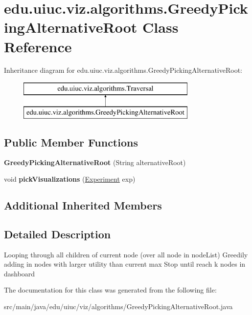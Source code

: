 \hypertarget{classedu_1_1uiuc_1_1viz_1_1algorithms_1_1_greedy_picking_alternative_root}{}\section{edu.\+uiuc.\+viz.\+algorithms.\+Greedy\+Picking\+Alternative\+Root Class Reference}
\label{classedu_1_1uiuc_1_1viz_1_1algorithms_1_1_greedy_picking_alternative_root}
Inheritance diagram for edu.\+uiuc.\+viz.\+algorithms.\+Greedy\+Picking\+Alternative\+Root\+:\begin{figure}[H]
\begin{center}
\leavevmode
\includegraphics[height=2.000000cm]{classedu_1_1uiuc_1_1viz_1_1algorithms_1_1_greedy_picking_alternative_root}
\end{center}
\end{figure}
\subsection*{Public Member Functions}
\begin{DoxyCompactItemize}
\item 
\mbox{\label{classedu_1_1uiuc_1_1viz_1_1algorithms_1_1_greedy_picking_alternative_root_ab9772e5e1186fd8b9c44ac91cec8b082}} 
{\bfseries Greedy\+Picking\+Alternative\+Root} (String alternative\+Root)
\item 
\mbox{\label{classedu_1_1uiuc_1_1viz_1_1algorithms_1_1_greedy_picking_alternative_root_af17a916e8f7ac5fe0d43965e74f99fd4}} 
void {\bfseries pick\+Visualizations} (\mbox{\hyperlink{classedu_1_1uiuc_1_1viz_1_1algorithms_1_1_experiment}{Experiment}} exp)
\end{DoxyCompactItemize}
\subsection*{Additional Inherited Members}


\subsection{Detailed Description}
Looping through all children of current node (over all node in node\+List) Greedily adding in nodes with larger utility than current max Stop until reach k nodes in dashboard 

The documentation for this class was generated from the following file\+:\begin{DoxyCompactItemize}
\item 
src/main/java/edu/uiuc/viz/algorithms/Greedy\+Picking\+Alternative\+Root.\+java\end{DoxyCompactItemize}
